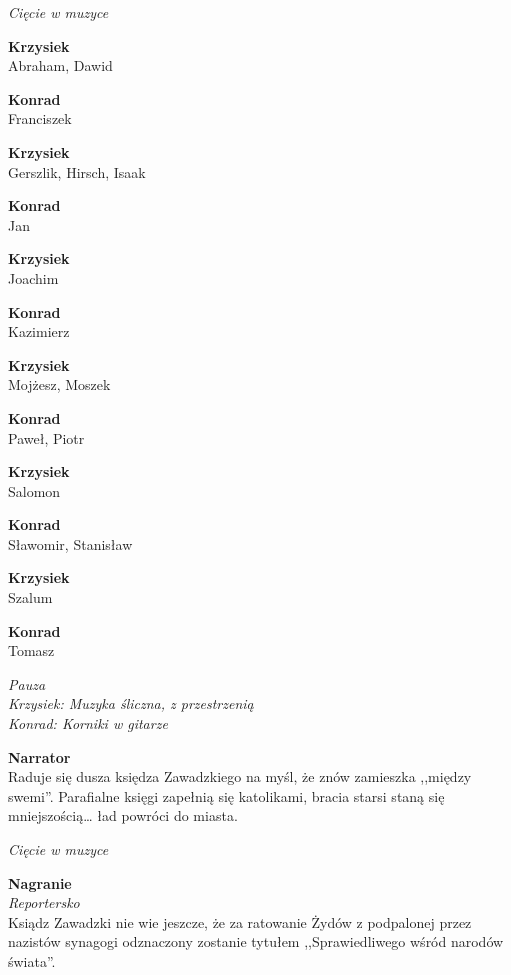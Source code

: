 \documentclass[11pt,a4paper,oneside]{article}
\begin{document}
{\color{light-gray} \emph{Cięcie w muzyce}}

{\color{krzysiek}
\textbf{Krzysiek}\\
Abraham, Dawid
}

{\color{konrad}
\textbf{Konrad}\\
Franciszek
}

{\color{krzysiek}
\textbf{Krzysiek}\\
Gerszlik, Hirsch, Isaak
}

{\color{konrad}
\textbf{Konrad}\\
Jan
}

{\color{krzysiek}
\textbf{Krzysiek}\\
Joachim
}

{\color{konrad}
\textbf{Konrad}\\
Kazimierz
}

{\color{krzysiek}
\textbf{Krzysiek}\\
Mojżesz,  Moszek
}

{\color{konrad}
\textbf{Konrad}\\
Paweł, Piotr
}

{\color{krzysiek}
\textbf{Krzysiek}\\
Salomon
}

{\color{konrad}
\textbf{Konrad}\\
Sławomir,  Stanisław
}

{\color{krzysiek}
\textbf{Krzysiek}\\
Szalum
}

{\color{konrad}
\textbf{Konrad}\\
Tomasz
}

{\color{light-gray} \emph{Pauza}}\\
{\color{krzysiek} \emph{Krzysiek: Muzyka śliczna, z przestrzenią}}\\
{\color{konrad} \emph{Konrad: Korniki w gitarze}}

\textbf{Narrator}\\
Raduje się dusza księdza Zawadzkiego na myśl, że znów zamieszka
,,między swemi''. Parafialne księgi zapełnią się katolikami, 
bracia starsi staną się mniejszością\dots{} ład powróci do miasta.

{\color{light-gray} \emph{Cięcie w muzyce}}

\textbf{Nagranie}\\
{\color{light-gray} \emph{Reportersko}}\\
Ksiądz Zawadzki nie wie jeszcze, że za ratowanie Żydów z podpalonej
przez nazistów synagogi odznaczony zostanie tytułem ,,Sprawiedliwego
wśród narodów świata''.
\end{document}
